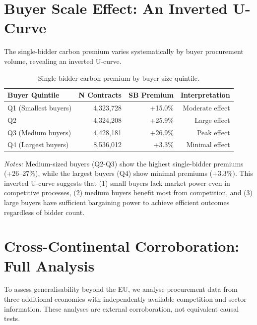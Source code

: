 \documentclass[11pt]{article}
\newcommand{\tabnoteblock}[1]{%
    \par\vspace{0.45em}%
    \begin{minipage}{0.98\linewidth}
    \footnotesize\raggedright #1
    \end{minipage}\par
}
\newcommand{\tabnotes}[1]{\tabnoteblock{\textit{Notes:} #1}}
\begin{document}
\section{Buyer Scale Effect: An Inverted U-Curve}

The single-bidder carbon premium varies systematically by buyer procurement volume, revealing an inverted U-curve.

\begin{table}[H]
\centering
\caption{Single-bidder carbon premium by buyer size quintile.}
\label{tab:buyer_scale}
\begin{tabular}{lrrr}
\toprule
\textbf{Buyer Quintile} & \textbf{N Contracts} & \textbf{SB Premium} & \textbf{Interpretation} \\
\midrule
Q1 (Smallest buyers) & 4,323,728 & +15.0\% & Moderate effect \\
Q2 & 4,324,208 & +25.9\% & Large effect \\
Q3 (Medium buyers) & 4,428,181 & +26.9\% & Peak effect \\
Q4 (Largest buyers) & 8,536,012 & +3.3\% & Minimal effect \\
\bottomrule
\end{tabular}

\tabnotes{Medium-sized buyers (Q2-Q3) show the highest single-bidder premiums (+26--27\%), while the largest buyers (Q4) show minimal premiums (+3.3\%). This inverted U-curve suggests that (1) small buyers lack market power even in competitive processes, (2) medium buyers benefit most from competition, and (3) large buyers have sufficient bargaining power to achieve efficient outcomes regardless of bidder count.
}
\end{table}

\section{Cross-Continental Corroboration: Full Analysis}
\label{sec:crosscontext_si}

To assess generalisability beyond the EU, we analyse procurement data from three additional economies with independently available competition and sector information. These analyses are external corroboration, not equivalent causal tests.
\end{document}
